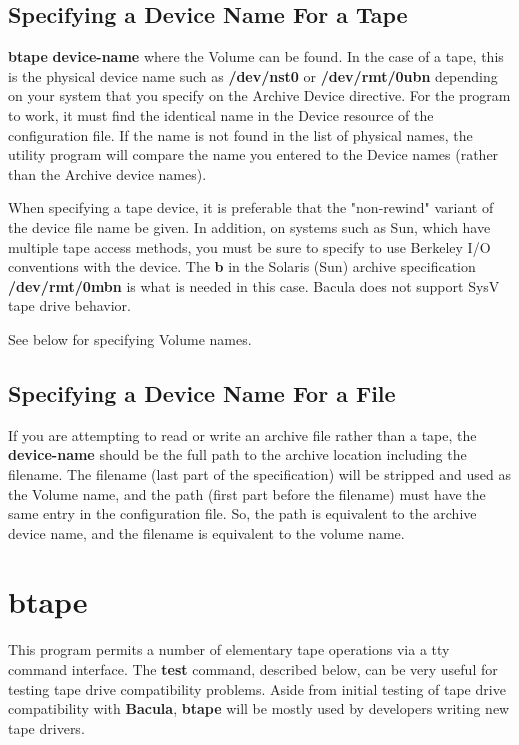 \subsection{Specifying a Device Name For a Tape}

{\bf btape} {\bf device-name} where the Volume can be found. In the case of a
tape, this is the physical device name such as {\bf /dev/nst0} or {\bf
/dev/rmt/0ubn} depending on your system that you specify on the Archive Device
directive. For the program to work, it must find the identical name in the
Device resource of the configuration file. If the name is not found in the
list of physical names, the utility program will compare the name you entered
to the Device names (rather than the Archive device names). 

When specifying a tape device, it is preferable that the "non-rewind"
variant of the device file name be given.  In addition, on systems such as
Sun, which have multiple tape access methods, you must be sure to specify
to use Berkeley I/O conventions with the device.  The
{\bf b} in the Solaris (Sun) archive specification {\bf /dev/rmt/0mbn} is
what is needed in this case.  Bacula does not support SysV tape drive
behavior.

See below for specifying Volume names. 

\subsection{Specifying a Device Name For a File}

If you are attempting to read or write an archive file rather than a tape, the
{\bf device-name} should be the full path to the archive location including
the filename. The filename (last part of the specification) will be stripped
and used as the Volume name, and the path (first part before the filename)
must have the same entry in the configuration file. So, the path is equivalent
to the archive device name, and the filename is equivalent to the volume name.


\section{btape}
\label{btape1}

This program permits a number of elementary tape operations via a tty command
interface. The {\bf test} command, described below, can be very useful for
testing tape drive compatibility problems. Aside from initial testing of tape
drive compatibility with {\bf Bacula}, {\bf btape} will be mostly used by
developers writing new tape drivers. 

